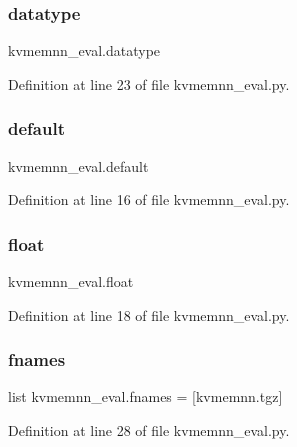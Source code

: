 \subsubsection{\texorpdfstring{datatype}{datatype}}
{\footnotesize\ttfamily kvmemnn\+\_\+eval.\+datatype}



Definition at line 23 of file kvmemnn\+\_\+eval.\+py.

\mbox{\label{namespacekvmemnn__eval_a6f35cf4c95dc84deca22e92e0a5b2f5b}} 
\subsubsection{\texorpdfstring{default}{default}}
{\footnotesize\ttfamily kvmemnn\+\_\+eval.\+default}



Definition at line 16 of file kvmemnn\+\_\+eval.\+py.

\mbox{\label{namespacekvmemnn__eval_a386b992fade09eeb52f9a80f477eb44c}} 
\subsubsection{\texorpdfstring{float}{float}}
{\footnotesize\ttfamily kvmemnn\+\_\+eval.\+float}



Definition at line 18 of file kvmemnn\+\_\+eval.\+py.

\mbox{\label{namespacekvmemnn__eval_a669fed16314bac6d94157f4f1ba3ece3}} 
\subsubsection{\texorpdfstring{fnames}{fnames}}
{\footnotesize\ttfamily list kvmemnn\+\_\+eval.\+fnames = \mbox{[}\textquotesingle{}kvmemnn.\+tgz\textquotesingle{}\mbox{]}}



Definition at line 28 of file kvmemnn\+\_\+eval.\+py.

